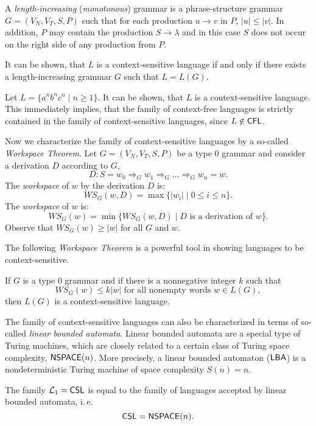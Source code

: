 A \emph{length-increasing} (\emph{monotonous}) grammar is a phrase-structure grammar $G = (V_N, V_T, S, P)$ such that for each production $u \to v$ in $P$, $|u| \le |v|$. In addition, $P$ may contain the production $S \to \lambda$ and in this case $S$ does not occur on the right side of any production from $P$.

It can be shown, that $L$ is a context-sensitive language if and only if there exists a length-increasing grammar $G$ such that $L = L(G)$.

Let $L = \{a^n b^n c^n \mid n \ge 1\}$. It can be shown, that $L$ is a context-sensitive language. This immediately implies, that the family of context-free languages is strictly contained in the family of context-sensitive languages, since $L \notin \textup{\sf CFL}$.

Now we characterize the family of context-sensitive languages by a so-called \emph{Workspace Theorem}. Let $G = (V_N, V_T, S, P)$ be a type $0$ grammar and consider a derivation $D$ according to $G$,
$$D: S = w_0 \Rightarrow_G w_1 \Rightarrow_G \ldots \Rightarrow_G w_n = w.$$
The \emph{workspace} of $w$ by the derivation $D$ is:
$$WS_G(w, D) = \max \{|w_i| \mid 0 \le i \le n\}.$$
The \emph{workspace} of $w$ is:
$$WS_G(w) = \min \{WS_G(w, D) \mid D \text{ is a derivation of } w\}.$$
Observe that $WS_G(w) \ge |w|$ for all $G$ and $w$.

The following \emph{Workspace Theorem} is a powerful tool in showing languages to be context-sensitive.

\begin{theorem}
If $G$ is a type $0$ grammar and if there is a nonnegative integer $k$ such that
$$WS_G(w) \le k |w| \text{ for all nonempty words } w \in L(G),$$
then $L(G)$ is a context-sensitive language.
\end{theorem}

The family of context-sensitive languages can also be characterized in terms of so-called \emph{linear bounded automata}. Linear bounded automata are a special type of Turing machines, which are closely related to a certain class of Turing space complexity, $\textup{\sf NSPACE}(n)$. More precisely, a linear bounded automaton \index{$\LBA$}($\LBA$) is a nondeterministic Turing machine of space complexity $S(n) = n$.

\begin{theorem}
The family $\mathcal{L}_1 = \textup{\sf CSL}$ is equal to the family of languages accepted by linear bounded automata, i.\,e.
$$\textup{\sf CSL} = \textup{\sf NSPACE}(n).$$
\end{theorem}

